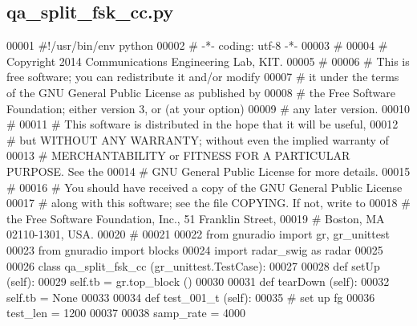 \subsection{qa\+\_\+split\+\_\+fsk\+\_\+cc.\+py}
\label{qa__split__fsk__cc_8py_source}

\begin{DoxyCode}
00001 \textcolor{comment}{#!/usr/bin/env python}
00002 \textcolor{comment}{# -*- coding: utf-8 -*-}
00003 \textcolor{comment}{# }
00004 \textcolor{comment}{# Copyright 2014 Communications Engineering Lab, KIT.}
00005 \textcolor{comment}{# }
00006 \textcolor{comment}{# This is free software; you can redistribute it and/or modify}
00007 \textcolor{comment}{# it under the terms of the GNU General Public License as published by}
00008 \textcolor{comment}{# the Free Software Foundation; either version 3, or (at your option)}
00009 \textcolor{comment}{# any later version.}
00010 \textcolor{comment}{# }
00011 \textcolor{comment}{# This software is distributed in the hope that it will be useful,}
00012 \textcolor{comment}{# but WITHOUT ANY WARRANTY; without even the implied warranty of}
00013 \textcolor{comment}{# MERCHANTABILITY or FITNESS FOR A PARTICULAR PURPOSE.  See the}
00014 \textcolor{comment}{# GNU General Public License for more details.}
00015 \textcolor{comment}{# }
00016 \textcolor{comment}{# You should have received a copy of the GNU General Public License}
00017 \textcolor{comment}{# along with this software; see the file COPYING.  If not, write to}
00018 \textcolor{comment}{# the Free Software Foundation, Inc., 51 Franklin Street,}
00019 \textcolor{comment}{# Boston, MA 02110-1301, USA.}
00020 \textcolor{comment}{# }
00021 
00022 \textcolor{keyword}{from} gnuradio \textcolor{keyword}{import} gr, gr\_unittest
00023 \textcolor{keyword}{from} gnuradio \textcolor{keyword}{import} blocks
00024 \textcolor{keyword}{import} radar\_swig \textcolor{keyword}{as} radar
00025 
00026 \textcolor{keyword}{class }qa_split_fsk_cc (gr\_unittest.TestCase):
00027 
00028     \textcolor{keyword}{def }setUp (self):
00029         self.tb = gr.top\_block ()
00030 
00031     \textcolor{keyword}{def }tearDown (self):
00032         self.tb = \textcolor{keywordtype}{None}
00033 
00034     \textcolor{keyword}{def }test_001_t (self):
00035         \textcolor{comment}{# set up fg}
00036         test\_len = 1200
00037         
00038         samp\_rate = 4000

\end{DoxyCode}
